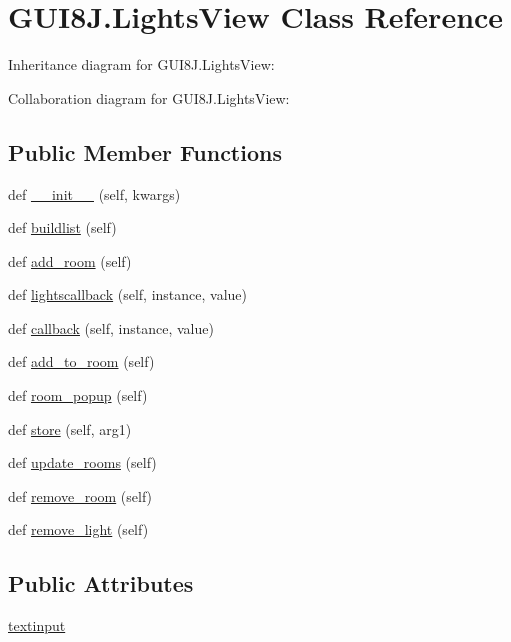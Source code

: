 \hypertarget{classGUI8J_1_1LightsView}{}\section{G\+U\+I8\+J.\+Lights\+View Class Reference}
\label{classGUI8J_1_1LightsView}


Inheritance diagram for G\+U\+I8\+J.\+Lights\+View\+:


Collaboration diagram for G\+U\+I8\+J.\+Lights\+View\+:
\subsection*{Public Member Functions}
\begin{DoxyCompactItemize}
\item 
def \hyperlink{classGUI8J_1_1LightsView_aa869b90f2eb911a68ef3e77eb3a6a82a}{\+\_\+\+\_\+init\+\_\+\+\_\+} (self, kwargs)
\item 
def \hyperlink{classGUI8J_1_1LightsView_a92d033a19bdb2038412ea15f49edf535}{buildlist} (self)
\item 
def \hyperlink{classGUI8J_1_1LightsView_a5ce2e25c5856187c98420e319c5fca7f}{add\+\_\+room} (self)
\item 
def \hyperlink{classGUI8J_1_1LightsView_ad6ba3cded3ba2e6bf1da130625544a5c}{lightscallback} (self, instance, value)
\item 
def \hyperlink{classGUI8J_1_1LightsView_a45a9730f55978a8fc4c452dfa583332d}{callback} (self, instance, value)
\item 
def \hyperlink{classGUI8J_1_1LightsView_ac3ed1b51f74c502b2fd9ad7c36d3dcbd}{add\+\_\+to\+\_\+room} (self)
\item 
def \hyperlink{classGUI8J_1_1LightsView_ac4e2881bc3e4ce75ddf8b1937722974e}{room\+\_\+popup} (self)
\item 
def \hyperlink{classGUI8J_1_1LightsView_a829d96000de9fe0044acd685e005af0d}{store} (self, arg1)
\item 
def \hyperlink{classGUI8J_1_1LightsView_a6bb6e91505cef521592ecc5e231ca893}{update\+\_\+rooms} (self)
\item 
def \hyperlink{classGUI8J_1_1LightsView_addfb70b9f5e33de1f69d5b8880ad741f}{remove\+\_\+room} (self)
\item 
def \hyperlink{classGUI8J_1_1LightsView_a1a3f0a8522cfbe99e38330c862bacbad}{remove\+\_\+light} (self)
\end{DoxyCompactItemize}
\subsection*{Public Attributes}
\begin{DoxyCompactItemize}
\item 
\hyperlink{classGUI8J_1_1LightsView_ae46a41876c688b387ead511b3bf4e780}{textinput}
\end{DoxyCompactItemize}


